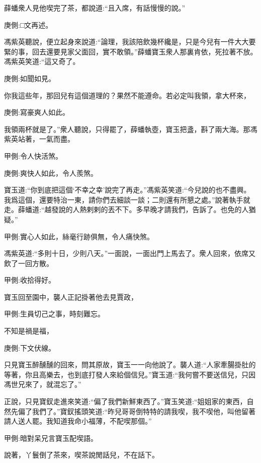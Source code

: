 \begin{parag}
    薛蟠衆人見他喫完了茶，都說道:“且入席，有話慢慢的說。”\begin{note}庚側:□文再述。\end{note}馮紫英聽說，便立起身來說道:“論理，我該陪飲幾杯纔是，只是今兒有一件大大要緊的事，回去還要見家父面回，實不敢領。”薛蟠寶玉衆人那裏肯依，死拉著不放。馮紫英笑道:“這又奇了。\begin{note}庚側:如聞如見。\end{note}你我這些年，那回兒有這個道理的？果然不能遵命。若必定叫我領，拿大杯來，\begin{note}庚側:寫豪爽人如此。\end{note}我領兩杯就是了。”衆人聽說，只得罷了，薛蟠執壺，寶玉把盞，斟了兩大海。那馮紫英站著，一氣而盡。\begin{note}甲側:令人快活煞。\end{note}\begin{note}庚側:爽快人如此，令人羨煞。\end{note}寶玉道:“你到底把這個‘不幸之幸’說完了再走。”馮紫英笑道:“今兒說的也不盡興。我爲這個，還要特治一東，請你們去細談一談；二則還有所懇之處。”說著執手就走。薛蟠道:“越發說的人熱剌剌的丟不下。多早晚才請我們，告訴了。也免的人猶疑。”\begin{note}甲側:實心人如此，絲毫行跡俱無，令人痛快煞。\end{note}馮紫英道:“多則十日，少則八天。”一面說，一面出門上馬去了。衆人回來，依席又飲了一回方散。\begin{note}甲側:收拾得好。\end{note}
\end{parag}


\begin{parag}
    寶玉回至園中，襲人正記掛著他去見賈政，\begin{note}甲側:生員切己之事，時刻難忘。\end{note}不知是禍是福，\begin{note}庚側:下文伏線。\end{note}只見寶玉醉醺醺的回來，問其原故，寶玉一一向他說了。襲人道:“人家牽腸掛肚的等著，你且高樂去，也到底打發人來給個信兒。”寶玉道:“我何嘗不要送信兒，只因馮世兄來了，就混忘了。”
\end{parag}


\begin{parag}
    正說，只見寶釵走進來笑道:“偏了我們新鮮東西了。”寶玉笑道:“姐姐家的東西，自然先偏了我們了。”寶釵搖頭笑道:“昨兒哥哥倒特特的請我喫，我不喫他，叫他留著請人送人罷。我知道我命小福薄，不配喫那個。”\begin{note}甲側:暗對呆兄言寶玉配喫語。\end{note}說著，丫鬟倒了茶來，喫茶說閒話兒，不在話下。
\end{parag}


